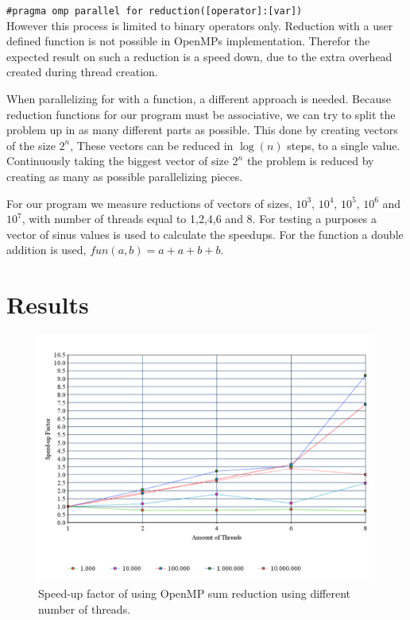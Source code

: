 \documentclass[a4paper,12px]{article}
\begin{document}
\texttt{\#pragma omp parallel for reduction([operator]:[var])}\\

However this process is limited to binary operators only. Reduction with a user
defined function is not possible in OpenMPs implementation. Therefor the
expected result on such a reduction is a speed down, due to the extra overhead
created during thread creation.

When parallelizing for with a function, a different approach is needed. Because
reduction functions for our program must be associative, we can try to split the
problem up in as many different parts as possible. This done by creating vectors
of the size $2^n$, These vectors can be reduced in $\log(n)$ steps, to a single
value.  Continuously taking the biggest vector of size $2^n$ the problem is
reduced by creating as many as possible parallelizing pieces.

For our program we measure reductions of vectors of sizes, $10^3$, $10^4$,
$10^5$, $10^6$ and $10^7$, with number of threads equal to 1,2,4,6 and 8. For
testing a purposes a vector of sinus values is used to calculate the speedups.
For the function a double addition is used, $fun(a,b) = a+a+b+b$.

\section{Results}

\begin{figure}[H]
    \centering
    \includegraphics[width=\textwidth]{sum}
    \caption{Speed-up factor of using OpenMP sum reduction using different
    number of threads.}
\end{figure}
\end{document}
